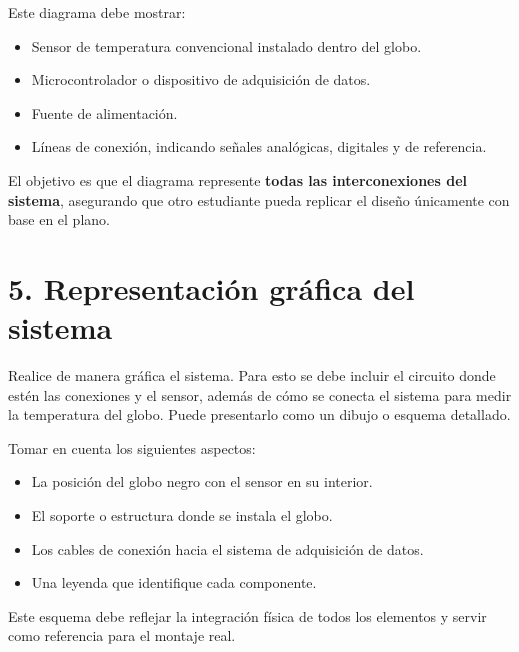 \documentclass[11pt]{article}
\begin{document}
Este diagrama debe mostrar:

\begin{itemize}
    \item Sensor de temperatura convencional instalado dentro del globo.
    \item Microcontrolador o dispositivo de adquisición de datos.
    \item Fuente de alimentación.
    \item Líneas de conexión, indicando señales analógicas, digitales y de referencia.
\end{itemize}

El objetivo es que el diagrama represente \textbf{todas las interconexiones del sistema}, asegurando que otro estudiante pueda replicar el diseño únicamente con base en el plano.

\section*{5. Representación gráfica del sistema}
Realice de manera gráfica el sistema. Para esto se debe incluir el circuito donde estén las conexiones y el sensor, además de cómo se conecta el sistema para medir la temperatura del globo. Puede presentarlo como un dibujo o esquema detallado. 

Tomar en cuenta los siguientes aspectos:
\begin{itemize}
    \item La posición del globo negro con el sensor en su interior.
    \item El soporte o estructura donde se instala el globo.
    \item Los cables de conexión hacia el sistema de adquisición de datos.
    \item Una leyenda que identifique cada componente.
\end{itemize}

Este esquema debe reflejar la integración física de todos los elementos y servir como referencia para el montaje real.
\end{document}
